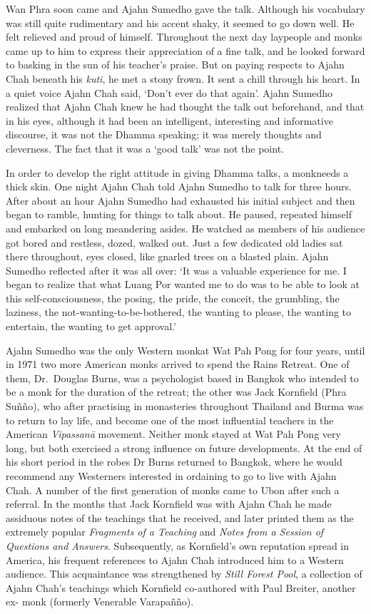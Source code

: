 Wan Phra soon came and Ajahn Sumedho gave the talk. Although his
vocabulary was still quite rudimentary and his accent shaky, it seemed
to go down well. He felt relieved and proud of himself. Throughout the
next day laypeople and monks came up to him to express their
appreciation of a fine talk, and he looked forward to basking in the sun
of his teacher's praise. But on paying respects to Ajahn Chah beneath
his \emph{kuti}, he met a stony frown. It sent a chill through his
heart. In a quiet voice Ajahn Chah said, `Don't ever do that again'.
Ajahn Sumedho realized that Ajahn Chah knew he had thought the talk out
beforehand, and that in his eyes, although it had been an intelligent,
interesting and informative discourse, it was not the Dhamma speaking;
it was merely thoughts and cleverness. The fact that it was a `good
talk' was not the point.

In order to develop the right attitude in giving Dhamma talks, a
monkneeds a thick skin. One night Ajahn Chah told Ajahn Sumedho to talk
for three hours. After about an hour Ajahn Sumedho had exhausted his
initial subject and then began to ramble, hunting for things to talk
about. He paused, repeated himself and embarked on long meandering
asides. He watched as members of his audience got bored and restless,
dozed, walked out. Just a few dedicated old ladies sat there throughout,
eyes closed, like gnarled trees on a blasted plain. Ajahn Sumedho
reflected after it was all over: `It was a valuable experience for me. I
began to realize that what Luang Por wanted me to do was to be able to
look at this self-consciousness, the posing, the pride, the conceit, the
grumbling, the laziness, the not-wanting-to-be-bothered, the wanting to
please, the wanting to entertain, the wanting to get approval.'

Ajahn Sumedho was the only Western monkat Wat Pah Pong for four years,
until in 1971 two more American monks arrived to spend the Rains
Retreat. One of them, Dr.~Douglas Burns, was a psychologist based in
Bangkok who intended to be a monk for the duration of the retreat; the
other was Jack Kornfield (Phra Suñño), who after practising in
monasteries throughout Thailand and Burma was to return to lay life, and
become one of the most influential teachers in the American
\emph{Vipassanā} movement. Neither monk stayed at Wat Pah Pong very
long, but both exercised a strong influence on future developments. At
the end of his short period in the robes Dr Burns returned to Bangkok,
where he would recommend any Westerners interested in ordaining to go to
live with Ajahn Chah. A number of the first generation of monks came to
Ubon after such a referral. In the months that Jack Kornfield was with
Ajahn Chah he made assiduous notes of the teachings that he received,
and later printed them as the extremely popular \emph{Fragments of a
Teaching} and \emph{Notes from a Session of Questions and Answers}.
Subsequently, as Kornfield's own reputation spread in America, his
frequent references to Ajahn Chah introduced him to a Western audience.
This acquaintance was strengthened by \emph{Still Forest Pool}, a
collection of Ajahn Chah's teachings which Kornfield co-authored with
Paul Breiter, another ex- monk (formerly Venerable Varapañño).

